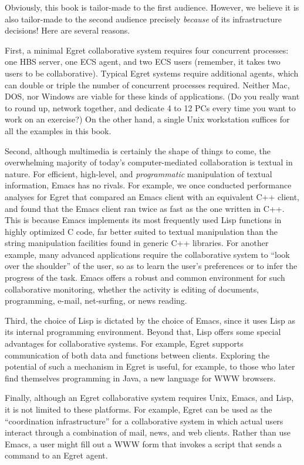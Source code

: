 Obviously, this book is tailor-made to the first audience.  However, we
believe it is also tailor-made to the second audience precisely {\em
because} of its infrastructure decisions! Here are several reasons.

First, a minimal Egret collaborative system requires four concurrent
processes: one HBS server, one ECS agent, and two ECS users (remember, it
takes two users to be collaborative).  Typical Egret systems require
additional
agents, which can double or triple the number of concurrent
processes required.  Neither Mac, DOS, nor Windows are viable for these
kinds of applications. (Do you really want to round up, network together,
and dedicate 4 to 12 PCs every time you want to work on an exercise?)  On
the other hand, a single Unix workstation suffices for all the examples in
this book.

Second, although multimedia is certainly the shape of things to come, the
overwhelming majority of today's computer-mediated collaboration is textual
in nature.  For efficient, high-level, and {\em programmatic} manipulation
of textual information, Emacs has no rivals. For example, we once conducted
performance analyses for Egret that compared an Emacs client with an
equivalent C++ client, and found that the Emacs client ran twice as fast as
the one written in C++. This is because Emacs implements its most
frequently used Lisp functions in highly optimized C code, far better
suited to textual manipulation than the string manipulation facilities
found in generic C++ libraries.  For another example, many advanced
applications require the collaborative system to ``look over the shoulder''
of the user, so as to learn the user's preferences or to infer the progress
of the task.  Emacs offers a robust and common environment for such
collaborative monitoring, whether the activity is editing of documents,
programming, e-mail, net-surfing, or news reading.

Third, the choice of Lisp is dictated by the choice of Emacs, since it uses
Lisp as its internal programming environment.  Beyond that, Lisp offers
some special advantages for collaborative systems.  For example, Egret
supports communication of both data and functions between clients.
Exploring the potential of such a mechanism in Egret is useful, for
example, to those who later find themselves programming in Java, a new
language for WWW browsers.

Finally, although an Egret collaborative system requires Unix, Emacs, and
Lisp, it is not limited to these platforms.  For example, Egret can be used
as the ``coordination infrastructure'' for a collaborative system in which
actual users interact through a combination of mail, news, and web clients.
Rather than use Emacs, a user might fill out a WWW form that invokes a
script that sends a command to an Egret agent.

